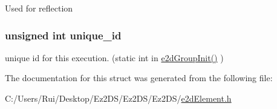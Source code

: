 Used for reflection \hypertarget{structe2d_element_a300bb6cf5b184e200523e9bce8346dc4}{
\subsubsection[{unique\-\_\-id}]{\setlength{\rightskip}{0pt plus 5cm}unsigned int {\bf unique\-\_\-id}}}\label{structe2d_element_a300bb6cf5b184e200523e9bce8346dc4}
unique id for this execution. (static int in \hyperlink{group__e2d_group_ga25406e9ff8a7746af03833e40ccf259a}{e2d\-Group\-Init()} ) 

The documentation for this struct was generated from the following file\-:\begin{DoxyCompactItemize}
\item 
C\-:/\-Users/\-Rui/\-Desktop/\-Ez2\-D\-S/\-Ez2\-D\-S/\-Ez2\-D\-S/\hyperlink{e2d_element_8h}{e2d\-Element.\-h}\end{DoxyCompactItemize}
